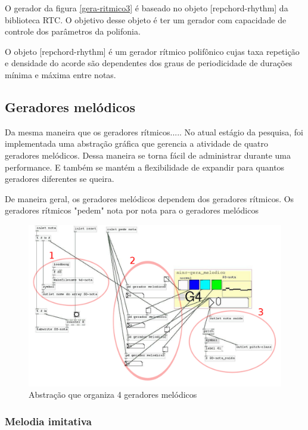 \documentclass{ppgmus}
\begin{document}
O gerador da figura \ref{gera-ritmico3} é baseado no 
objeto [repchord-rhythm] da biblioteca RTC. O objetivo desse objeto é 
ter um gerador com capacidade de controle dos parâmetros da polifonia.

O objeto [repchord-rhythm] é um gerador rítmico polifônico cujas taxa repetição
e densidade do acorde são dependentes dos graus de periodicidade de durações
mínima e máxima entre notas. 


\subsection{Geradores melódicos}


Da mesma maneira que os geradores rítmicos.....
No atual estágio da pesquisa, foi implementada uma abstração gráfica
que gerencia a atividade de quatro geradores melódicos. Dessa
maneira se torna fácil de administrar durante uma performance.
E também se mantém a flexibilidade de expandir para quantos
geradores diferentes se queira.


De maneira geral, os geradores melódicos dependem dos geradores
rítmicos. Os geradores rítmicos "pedem" nota por nota para o geradores
melódicos


\begin{figure}
\includegraphics[scale=.45]{sinc-gera-melodico}
\caption{Abstração que organiza 4 geradores melódicos}
\label{[sinc-gera-melodico]}
\end{figure}


\subsubsection{Melodia imitativa}
\end{document}
